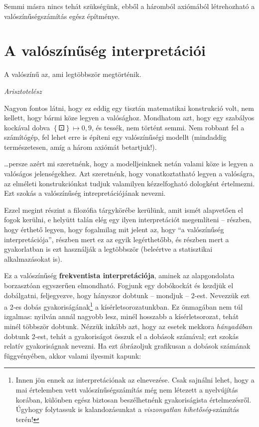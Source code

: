 \documentclass[magyar,]{book}
\let\rmarkdownfootnote\footnote%
\def\footnote{\protect\rmarkdownfootnote}
\begin{document}
Semmi másra nincs tehát szükségünk, ebből a háromból axiómából létrehozható a valószínűségszámítás egész építménye.

\hypertarget{valinterpretacio}{%
\section{A valószínűség interpretációi}\label{valinterpretacio}}

\epigraph{A valószínű az, ami legtöbbször megtörténik.}{\textit{Arisztotelész}}

Nagyon fontos látni, hogy ez eddig egy tisztán matematikai konstrukció volt, nem kellett, hogy bármi köze legyen a valósághoz. Mondhatom azt, hogy egy szabályos kockával dobva \(\left\{⚀\right\}\mapsto 0,\!9\), és tessék, nem történt semmi. Nem robbant fel a számítógép, fel lehet erre is építeni egy valószínűségi modellt (mindaddig természetesen, amíg a három axiómát betartjuk!).

\ldots persze azért mi szeretnénk, hogy a modelljeinknek netán valami köze is legyen a valóságos jelenségekhez. Azt szeretnénk, hogy vonatkoztatható legyen a valóságra, az elméleti konstrukciónkat tudjuk valamilyen kézzelfogható dologként értelmezni. Ezt szokás a valószínűség intrepretációjának nevezni.

Ezzel megint részint a filozófia tárgykörébe kerülünk, amit ismét alapvetően el fogok kerülni, e helyütt talán elég egy ilyen interpretációt megemlíteni -- részben, hogy érthető legyen, hogy fogalmilag mit jelent az, hogy \enquote{a valószínűség interpretációja}, részben mert ez az egyik legérthetőbb, és részben mert a gyakorlatban is ezt használják a legtöbbször (beleértve a statisztikai alkalmazásokat is).

Ez a valószínűség \textbf{frekventista interpretációja}, aminek az alapgondolata borzasztóan egyszerűen elmondható. Fogjunk egy dobókockát és kezdjük el dobálgatni, feljegyezve, hogy hányszor dobtunk -- mondjuk -- 2-est. Nevezzük ezt a 2-es dobás gyakoriságának\footnote{Innen jön ennek az interpretációnak az elnevezése. Csak sajnálni lehet, hogy a mai értelemben vett valószínűségszámítás még nem létezett a nyelvújítás korában, különben egész biztosan beszélhetnénk gyakoriságista értelmezésről. Úgyhogy folytassuk is kalandozásunkat a \emph{viszonyatlan hihetőség}-számítás terén!} a kísérletsorozatunkban. Ez önmagában nem túl izgalmas: nyilván annál nagyobb lesz, minél hosszabb a kísérletsorozat, tehát minél többször dobtunk. Nézzük inkább azt, hogy az esetek mekkora \emph{hányadában} dobtunk 2-est, tehát a gyakoriságot összuk el a dobások számával; ezt szokás relatív gyakoriságnak nevezni. Ha ezt ábrázoljuk grafikusan a dobások számának függvényében, akkor valami ilyesmit kapunk:
\end{document}
